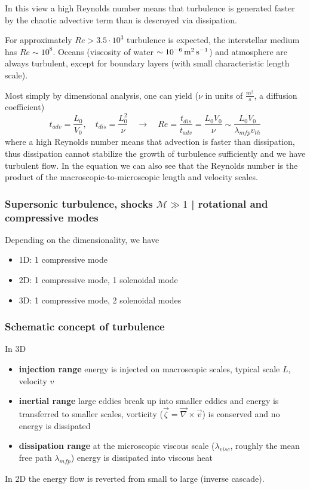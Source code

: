 In this view a high Reynolds number means that turbulence is generated faster by the chaotic advective term than is descroyed via dissipation.

\begin{mdframed}[style=padded]
    For approximately $Re > 3.5 \cdot 10^3$ turbulence is expected, the interstellar medium has $Re \sim 10^{8}$. Oceans (viscosity of water $\sim 10^{-6} \operatorname{m}^2 \operatorname{s}^{-1}$) and atmosphere are always turbulent, except for boundary layers (with small characteristic length scale).
\end{mdframed}

Most simply by dimensional analysis, one can yield ($\nu$ in units of $\frac{m^2}{s}$, a diffusion coefficient)
\begin{equation}
    t_{adv} = \frac{L_0}{V_0}, \quad t_{dis} = \frac{L_0^2}{\nu} \quad \rightarrow \quad Re = \frac{t_{dis}}{t_{adv}} = \frac{L_0 V_0}{\nu} \sim \frac{L_0 V_0}{\lambda_{mfp} v_{th}}
\end{equation}
where a high Reynolds number means that advection is faster than dissipation, thus dissipation cannot stabilize
the growth of turbulence sufficiently and we have turbulent flow. In the equation we can also see that the Reynolds number
is the product of the macroscopic-to-microscopic length and velocity scales.

\subsubsection{Supersonic turbulence, shocks $\mathcal{M} \gg 1$ | rotational and compressive modes}
Depending on the dimensionality, we have
\begin{itemize}
    \item 1D: 1 compressive mode
    \item 2D: 1 compressive mode, 1 solenoidal mode
    \item 3D: 1 compressive mode, 2 solenoidal modes
\end{itemize}

\subsubsection{Schematic concept of turbulence}
In 3D
\begin{itemize}
    \item \textbf{injection range} energy is injected on macroscopic scales, typical scale $L$, velocity $v$
    \item \textbf{inertial range} large eddies break up into smaller eddies and energy is transferred to smaller scales, vorticity ($\vec{\zeta} = \vec{\nabla}\times \vec{v}$) is conserved and no energy is dissipated
    \item \textbf{dissipation range} at the microscopic viscous scale ($\lambda_{visc}$, roughly the mean free path $\lambda_{mfp}$) energy is dissipated into viscous heat
\end{itemize}
In 2D the energy flow is reverted from small to large (inverse cascade).

